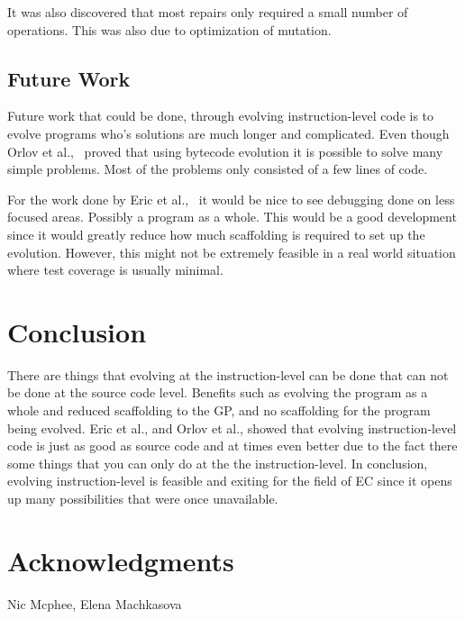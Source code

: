\documentclass{sig-alternate}
\begin{document}
It was also discovered that most repairs only required a small number of operations. This was also due to optimization of mutation. 

\subsection{Future Work}
Future work that could be done, through evolving instruction-level code is to evolve programs who's solutions are much longer and complicated. Even though Orlov et al.,~\cite{FINCH:2011} proved that using bytecode evolution it is possible to solve many simple problems. Most of the problems only consisted of a few lines of code.

For the work done by Eric et al.,~\cite{Assembly:2010} it would be nice to see debugging done on less focused areas. Possibly a program as a whole. This would be a good development since it would greatly reduce how much scaffolding is required to set up the evolution. However, this might not be extremely feasible in a real world situation where test coverage is usually minimal.


\section{Conclusion}
There are things that evolving at the instruction-level can be done that can not be done at the source code level. Benefits such as evolving the program as a whole and reduced scaffolding to the GP, and no scaffolding for the program being evolved. Eric et al., and Orlov et al., showed that evolving instruction-level code is just as good as source code and at times even better due to the fact there some things that you can only do at the the instruction-level. In conclusion, evolving instruction-level is feasible and exiting for the field of EC since it opens up many possibilities that were once unavailable.

\section{Acknowledgments}
Nic Mcphee, Elena Machkasova

%

%
%
\end{document}
